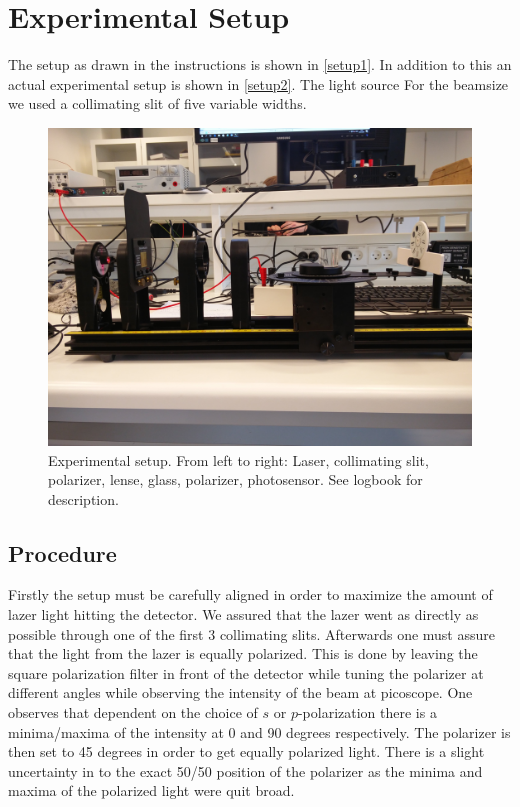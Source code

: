 \section{Experimental Setup}
The setup as drawn in the instructions is shown in \cref{setup1}. In addition to this an actual experimental setup is shown in \cref{setup2}. 
The light source For the beamsize we used a collimating slit of five variable widths.

\begin{figure}[h]
    \centering
    \includegraphics[trim={0 25cm 0 20cm}, clip, width=\columnwidth]{setup}
    \caption{Experimental setup. From left to right: Laser, collimating slit, polarizer, lense, glass, polarizer, photosensor. See logbook for description.}
    \label{fig:setup}
\end{figure}

\subsection{Procedure}

Firstly the setup must be carefully aligned in order to maximize the amount of lazer light hitting the detector.  We assured that the lazer went as directly as possible through one of the first 3 collimating slits. Afterwards one must assure that the light from the lazer is equally polarized. This is done by leaving the square polarization filter in front of the detector while tuning the polarizer at different angles while observing the intensity of the beam at picoscope. One observes that dependent on the choice of $s$ or $p$-polarization there is a minima/maxima of the intensity at 0 and 90 degrees respectively. The polarizer is then set to 45 degrees in order to get equally polarized light. There is a slight uncertainty in to the exact 50/50 position of the polarizer as the minima and maxima of the polarized light were quit broad.\\

